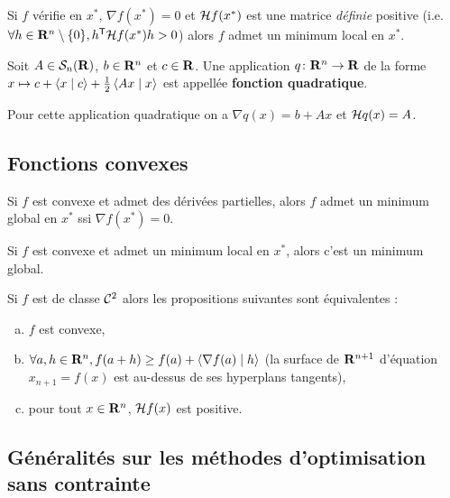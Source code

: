 \begin{thm}
	Si $f$ vérifie en $x^*$, $\nabla f(x^*) = 0$ et $\mathcal{H} f(x^*)$ est une matrice \emph{définie} positive (i.e. $\forall h \in \mathbf{R}^n \setminus \{ 0 \}, h^\mathsf{T} \mathcal{H} f(x^*) h > 0$) alors $f$ admet un minimum local en $x^*$.
\end{thm}

\begin{defn}
	Soit $A \in \mathcal{S}_n(\mathbf{R})$, $b \in \mathbf{R}^n$ et $c \in \mathbf{R}$.
	Une application $q \colon \mathbf{R}^n \to \mathbf{R}$ de la forme $x \mapsto c + \left\langle x \mid c \right\rangle + \frac{1}{2} \left\langle Ax \mid x \right\rangle$ est appellée \textbf{fonction quadratique}.
\end{defn}

Pour cette application quadratique on a $\nabla q(x) = b + Ax$ et $\mathcal{H} q(x) = A$.


\subsection{Fonctions convexes}

	\begin{thm}
		Si $f$ est convexe et admet des dérivées partielles, alors $f$ admet un minimum global en $x^*$ ssi $\nabla f(x^*) = 0$.
	\end{thm}

	\begin{thm}
		Si $f$ est convexe et admet un minimum local en $x^*$, alors c'est un minimum global.
	\end{thm}

	\begin{thm}
		Si $f$ est de classe $\mathcal{C}^2$ alors les propositions suivantes sont équivalentes :
		\begin{enumerate}[(a)]
			\item $f$ est convexe,
			\item $\forall a, h \in \mathbf{R}^n, f(a + h) \geq f(a) + \left\langle \nabla f(a) \mid h \right\rangle$ (la surface de $\mathbf{R}^{n + 1}$ d'équation $x_{n + 1} = f(x)$ est au-dessus de ses hyperplans tangents),
			\item pour tout $x \in \mathbf{R}^n$, $\mathcal{H} f(x)$ est positive.
		\end{enumerate}
	\end{thm}


\subsection{Généralités sur les méthodes d'optimisation sans contrainte}

